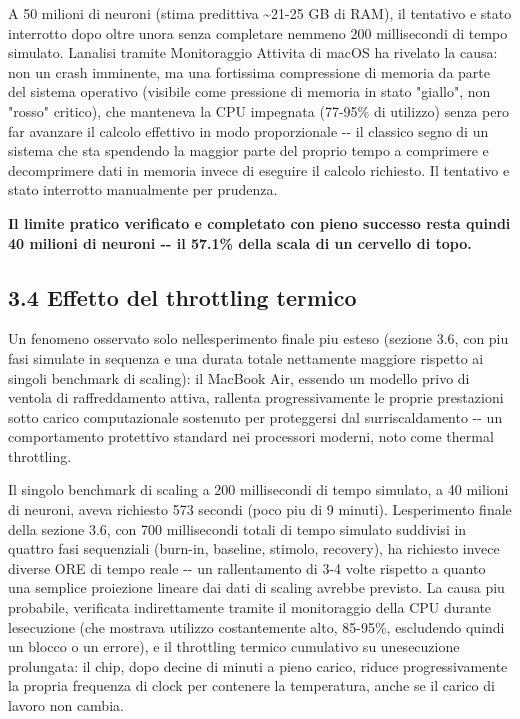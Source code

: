 \documentclass[
  italian,
]{article}
\begin{document}
A 50 milioni di neuroni (stima predittiva \textasciitilde21-25 GB di RAM), il tentativo e\textquotesingle{} stato interrotto dopo oltre un\textquotesingle ora senza completare nemmeno 200 millisecondi di tempo simulato. L\textquotesingle analisi tramite Monitoraggio Attivita\textquotesingle{} di macOS ha rivelato la causa: non un crash imminente, ma una fortissima compressione di memoria da parte del sistema operativo (visibile come pressione di memoria in stato "giallo", non "rosso" critico), che manteneva la CPU impegnata (77-95\% di utilizzo) senza pero\textquotesingle{} far avanzare il calcolo effettivo in modo proporzionale -\/- il classico segno di un sistema che sta spendendo la maggior parte del proprio tempo a comprimere e decomprimere dati in memoria invece di eseguire il calcolo richiesto. Il tentativo e\textquotesingle{} stato interrotto manualmente per prudenza.

\textbf{Il limite pratico verificato e completato con pieno successo resta quindi 40 milioni di neuroni -\/- il 57.1\% della scala di un cervello di topo.}

\subsection{3.4 Effetto del throttling termico}\label{effetto-del-throttling-termico}

Un fenomeno osservato solo nell\textquotesingle esperimento finale piu\textquotesingle{} esteso (sezione 3.6, con piu\textquotesingle{} fasi simulate in sequenza e una durata totale nettamente maggiore rispetto ai singoli benchmark di scaling): il MacBook Air, essendo un modello privo di ventola di raffreddamento attiva, rallenta progressivamente le proprie prestazioni sotto carico computazionale sostenuto per proteggersi dal surriscaldamento -\/- un comportamento protettivo standard nei processori moderni, noto come thermal throttling.

Il singolo benchmark di scaling a 200 millisecondi di tempo simulato, a 40 milioni di neuroni, aveva richiesto 573 secondi (poco piu\textquotesingle{} di 9 minuti). L\textquotesingle esperimento finale della sezione 3.6, con 700 millisecondi totali di tempo simulato suddivisi in quattro fasi sequenziali (burn-in, baseline, stimolo, recovery), ha richiesto invece diverse ORE di tempo reale -\/- un rallentamento di 3-4 volte rispetto a quanto una semplice proiezione lineare dai dati di scaling avrebbe previsto. La causa piu\textquotesingle{} probabile, verificata indirettamente tramite il monitoraggio della CPU durante l\textquotesingle esecuzione (che mostrava utilizzo costantemente alto, 85-95\%, escludendo quindi un blocco o un errore), e\textquotesingle{} il throttling termico cumulativo su un\textquotesingle esecuzione prolungata: il chip, dopo decine di minuti a pieno carico, riduce progressivamente la propria frequenza di clock per contenere la temperatura, anche se il carico di lavoro non cambia.
\end{document}
